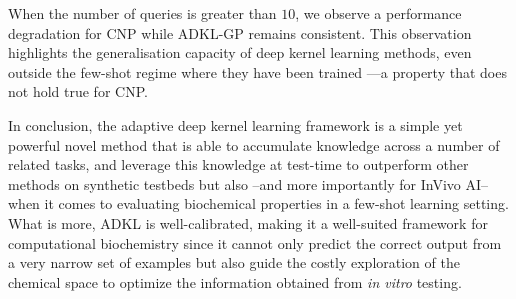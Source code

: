 \documentclass[11pt]{article}
\numberwithin{equation}{subsection}
\begin{document}
When the number of queries is greater than $10$, we observe a performance degradation for CNP while ADKL-GP remains consistent.
This observation highlights the generalisation capacity of deep kernel learning methods, even outside the few-shot regime where they have been trained ---a property that does not hold true for CNP.



In conclusion, the adaptive deep kernel learning framework is a simple yet powerful novel method that is able to accumulate knowledge across a number of related tasks, and leverage this knowledge at test-time to outperform other methods on synthetic testbeds but also –and more importantly for InVivo AI– when it comes to evaluating biochemical properties in a few-shot learning setting. What is more, ADKL is well-calibrated, making it a well-suited framework for computational biochemistry since it cannot only predict the correct output from a very narrow set of examples but also guide the costly exploration of the chemical space to optimize the information obtained from \textit{in vitro} testing.
\end{document}
